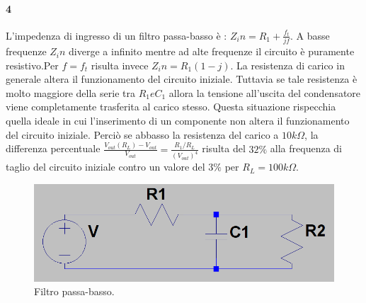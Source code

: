 \documentclass[10pt,a4paper]{article}
\begin{document}
\paragraph{4  }
L'impedenza di ingresso di un filtro passa-basso è : $Z_in = R_1 + \frac{f_t}{jf} $. A basse frequenze $Z_in$ diverge a infinito mentre ad alte frequenze il circuito è puramente resistivo.Per $f=f_t$ risulta invece $Z_in = R_1(1-j)$. 
La resistenza di carico in generale altera il funzionamento del circuito iniziale. Tuttavia se tale resistenza è molto maggiore della serie tra $R_1 e C_1$ allora la tensione all'uscita del condensatore viene completamente trasferita al carico stesso. Questa situazione rispecchia quella ideale in cui l'inserimento di un componente non altera il funzionamento del circuito iniziale. Perciò se abbasso la resistenza del carico a $10 k\Omega$, la differenza percentuale  $\frac{V_{out}(R_L)-V_{out}}{V_{out}} = \frac{R_1/R_L}{(V_{out})^4}$ risulta del $32 \%$ alla frequenza di taglio del circuito iniziale contro un valore del $3 \%$ per $R_L=100 k\Omega$.

\begin{figure}
\centering
\includegraphics[scale=0.4]{passa_basso.png}
\caption{Filtro passa-basso.\label{f:par2}}
\end{figure}
\end{document}
